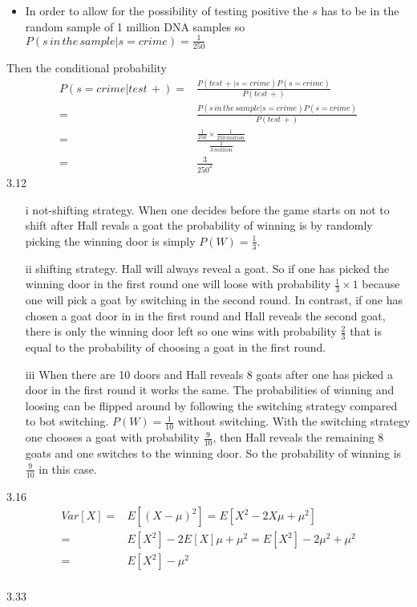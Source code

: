 \documentclass[letterpaper,12pt]{article}
\theoremstyle{definition}
\begin{document}
\begin{enumerate}
\begin{itemize}
\item In order to allow for the possibility of testing positive the $s$ has to be in the random sample of 1 million DNA samples so $P(s \, in \, the \, sample|s=crime)=\frac{1}{250}$
\end{itemize}
Then the conditional probability 
\begin{align*}
P(s=crime|test\, +)=&\frac{P(test\, +|s=crime)P(s=crime)}{P(test\, +)}\\
=& \frac{P(s \, in \, the \, sample|s=crime)P(s=crime)}{P(test\, +)}\\
=&\frac{\frac{1}{250}\times\frac{1}{250\, million}}{\frac{1}{3 \, million}} \\
=&\frac{3}{250^2}
\end{align*}
3.12 \\
\begin{itemize}
\item[i] not-shifting strategy. When one decides before the game starts on not to shift after Hall revals a goat the probability of winning is by randomly picking the winning door is simply $P(W) = \frac{1}{3}$.
\item[ii] shifting strategy. Hall will always reveal a goat. So if one has picked the winning door in the first round one will loose  with probability $\frac{1}{3}\times 1$ because one will pick a goat by switching in the second round. In contrast, if one has chosen a goat door in in the first round and Hall reveals the second goat, there is only the winning door left so one wins with probability $\frac{2}{3}$  that is equal to the probability of choosing a goat in the first round.
\item[iii] When there are 10 doors and Hall reveals 8 goats after one has picked a door in the first round it works the same. The probabilities of winning and loosing can be flipped around by following the switching strategy compared to  bot switching. $P(W)=\frac{1}{10}$ without switching. With the switching strategy one chooses a goat with probability $\frac{9}{10}$, then Hall reveals the remaining $8$ goats and one switches to the winning door. So  the probability of winning is $\frac{9}{10}$ in this case.
\end{itemize}

3.16\\
\begin{align*}
Var[X] =& E\left[ (X-\mu)^2 \right] = E\left[ X^2 - 2 X \mu + \mu^2 \right] \\
=& E[X^2] - 2E[X]\mu +\mu^2 =  E[X^2] - 2\mu^2 +\mu^2 \\
=&  E[X^2] - \mu^2 
\end{align*}\\
3.33\\


\end{enumerate}
\end{document}
